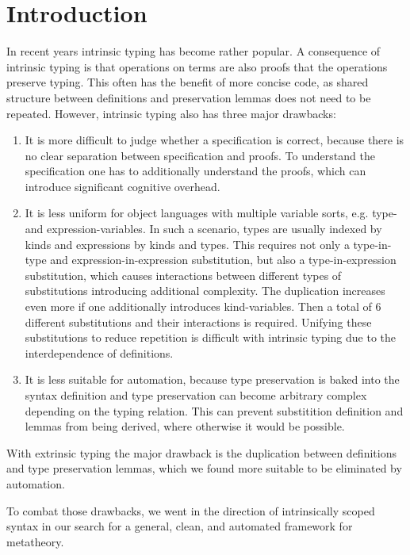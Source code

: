 \documentclass[sigplan,10pt, anonymous]{acmart}
\begin{document}
  \section{Introduction}
  In recent years intrinsic typing\cite{TODO} has become rather popular.
  A consequence of intrinsic typing is that operations on terms
  are also proofs that the operations preserve typing.
  This often has the benefit of more concise code, as shared structure
  between definitions and preservation lemmas does not need to be
  repeated.
  However, intrinsic typing also has three major drawbacks:
  \begin{enumerate}
  \item
    It is more difficult to judge whether a specification is correct,
    because there is no clear separation between specification and proofs.
    To understand the specification one has to additionally
    understand the proofs, which can introduce significant cognitive overhead.
  \item
    It is less uniform for object languages with multiple variable
    sorts, e.g. type- and expression-variables. In such a scenario,
    types are usually indexed by kinds and expressions by kinds and types.
    This requires not only a type-in-type and expression-in-expression
    substitution, but also a type-in-expression substitution, which causes
    interactions between different types of substitutions introducing
    additional complexity.
    The duplication increases even more if one additionally introduces
    kind-variables. Then a total of 6 different substitutions and
    their interactions is required.
    Unifying these substitutions to reduce repetition is difficult
    with intrinsic typing due to the interdependence of definitions.
  \item
    It is less suitable for automation, because type preservation is baked
    into the syntax definition and type preservation can become arbitrary complex
    depending on the typing relation. This can prevent substitition
    definition and lemmas from being derived, where otherwise it would be possible.
  \end{enumerate}
  With extrinsic typing the major drawback is the duplication between
  definitions and type preservation lemmas, which we found more
  suitable to be eliminated by automation.

  To combat those drawbacks, we went in the direction of intrinsically
  scoped syntax in our search for a general, clean, and automated framework
  for metatheory.
\end{document}
